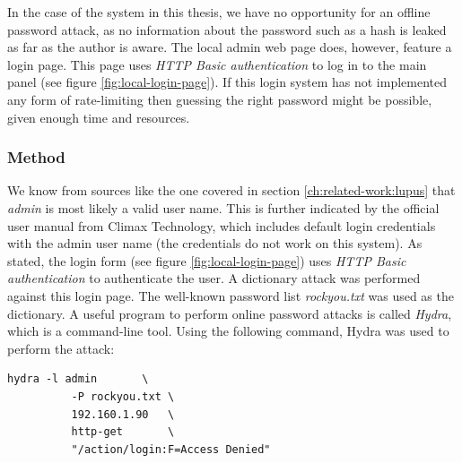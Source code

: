 In the case of the system in this thesis, we have no opportunity for an offline password attack, as no information about the password such as a hash is leaked as far as the author is aware. The local admin web page does, however, feature a login page. This page uses \textit{HTTP Basic authentication} to log in to the main panel (see figure \ref{fig:local-login-page}). If this login system has not implemented any form of rate-limiting then guessing the right password might be possible, given enough time and resources.

\subsubsection{Method}
We know from sources like the one covered in section \ref{ch:related-work:lupus} that \textit{admin} is most likely a valid user name. This is further indicated by the official user manual from Climax Technology, which includes default login credentials with the admin user name (the credentials do not work on this system). As stated, the login form (see figure \ref{fig:local-login-page}) uses \textit{HTTP Basic authentication} to authenticate the user. A dictionary attack was performed against this login page. The well-known password list \textit{rockyou.txt} was used as the dictionary. A useful program to perform online password attacks is called \textit{Hydra}, which is a command-line tool. Using the following command, Hydra was used to perform the attack:
\begin{lstlisting}[frame=tb]
    hydra -l admin       \
          -P rockyou.txt \
          192.160.1.90   \
          http-get       \
          "/action/login:F=Access Denied"
\end{lstlisting}


